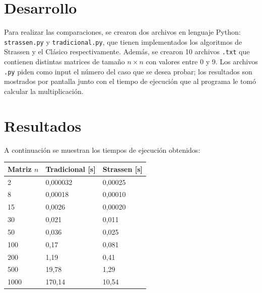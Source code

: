 \documentclass[a4paper,11pt]{article}
\begin{document}
\section{Desarrollo}
Para realizar las comparaciones, se crearon dos archivos en lenguaje Python: \texttt{strassen.py} y \texttt{tradicional.py}, que tienen implementados los algoritmos de Strassen y el Clásico respectivamente. Además, se crearon 10 archivos \texttt{.txt} que contienen distintas matrices de tamaño $n\times n$ con valores entre 0 y 9. Los archivos \texttt{.py} piden como input el número del caso que se desea probar; los resultados son mostrados por pantalla junto con el tiempo de ejecución que al programa le tomó calcular la multiplicación.

\section{Resultados}

A continuación se muestran los tiempos de ejecución obtenidos:
\begin{table}[h]
\centering
\begin{tabular}{|l|l|l|}
\hline
\textbf{Matriz $n$} & \textbf{Tradicional [s]} & \textbf{Strassen [s]} \\ \hline
2                         & 0,000032             & 0,00025           \\ \hline
8                         & 0,00018              & 0,00010           \\ \hline
15                        & 0,0026               & 0,00020           \\ \hline
30                        & 0,021                & 0,011             \\ \hline
50                        & 0,036                & 0,025             \\ \hline
100                       & 0,17                 & 0,081             \\ \hline
200                       & 1,19                 & 0,41              \\ \hline
500                       & 19,78                & 1,29              \\ \hline
1000                      & 170,14               & 10,54             \\ \hline
\end{tabular}
\end{table}
\end{document}

